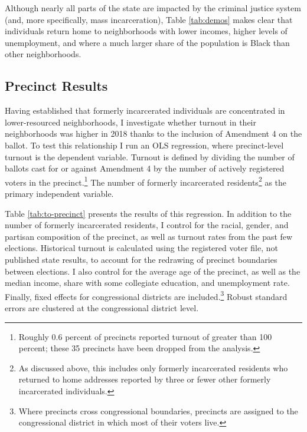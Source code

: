 \documentclass[
  12pt,
]{article}
\begin{document}


Although nearly all parts of the state are impacted by the criminal justice system (and, more specifically, mass incarceration), Table \ref{tab:demos} makes clear that individuals return home to neighborhoods with lower incomes, higher levels of unemployment, and where a much larger share of the population is Black than other neighborhoods.

\hypertarget{precinct-results}{%
\subsection{Precinct Results}\label{precinct-results}}

Having established that formerly incarcerated individuals are concentrated in lower-resourced neighborhoods, I investigate whether turnout in their neighborhoods was higher in 2018 thanks to the inclusion of Amendment 4 on the ballot. To test this relationship I run an OLS regression, where precinct-level turnout is the dependent variable. Turnout is defined by dividing the number of ballots cast for or against Amendment 4 by the number of actively registered voters in the precinct.\footnote{Roughly 0.6 percent of precincts reported turnout of greater than 100 percent; these 35 precincts have been dropped from the analysis.} The number of formerly incarcerated residents\footnote{As discussed above, this includes only formerly incarcerated residents who returned to home addresses reported by three or fewer other formerly incarcerated individuals.} as the primary independent variable.

Table \ref{tab:to-precinct} presents the results of this regression. In addition to the number of formerly incarcerated residents, I control for the racial, gender, and partisan composition of the precinct, as well as turnout rates from the past few elections. Historical turnout is calculated using the registered voter file, not published state results, to account for the redrawing of precinct boundaries between elections. I also control for the average age of the precinct, as well as the median income, share with some collegiate education, and unemployment rate. Finally, fixed effects for congressional districts are included.\footnote{Where precincts cross congressional boundaries, precincts are assigned to the congressional district in which most of their voters live.} Robust standard errors are clustered at the congressional district level.

\begin{singlespace}


\end{singlespace}
\end{document}
